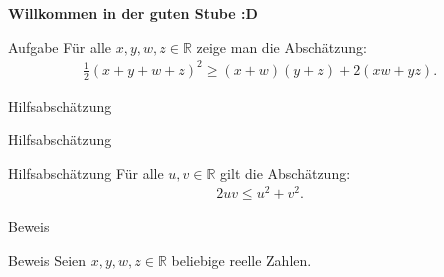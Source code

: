 \documentclass[10pt]{beamer}
\title{}
\author{Artur's Mathematikstübchen}
\date{}
\def\bR{\mathbb{R}}
\begin{document}

\begin{frame}
    \begin{center}
        \textbf{\huge Willkommen in der guten Stube \newline \newline :D}
    \end{center}
\end{frame}




\begin{frame}
    \begin{alertblock}{Aufgabe}
        Für alle \( x, y, w, z \in \bR \) zeige man die Abschätzung:
        \begin{align*}
            \frac{1}{2} \left( x + y + w + z \right)^{2}
            \geq \left( x + w \right) \left( y + z \right) + 2 \left( xw + yz \right).
        \end{align*}
    \end{alertblock}
\end{frame}



\begin{frame}{Hilfsabschätzung}
    
\end{frame}



\begin{frame}{Hilfsabschätzung}
    \begin{block}{Hilfsabschätzung}
        Für alle \( u, v \in \bR \) gilt die Abschätzung:
        \begin{align*}
            2uv
            \leq u^{2} + v^{2}.
        \end{align*}
    \end{block}
\end{frame}



\begin{frame}{Beweis}
    
\end{frame}



\begin{frame}{Beweis}
    Seien \( x, y, w, z \in \bR \) beliebige reelle Zahlen.
\end{frame}
\end{document}
